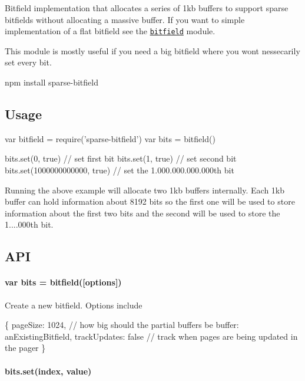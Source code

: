 Bitfield implementation that allocates a series of 1kb buffers to support sparse bitfields without allocating a massive buffer. If you want to simple implementation of a flat bitfield see the \href{https://github.com/fb55/bitfield}{\tt bitfield} module.

This module is mostly useful if you need a big bitfield where you won\textquotesingle{}t nessecarily set every bit.


\begin{DoxyCode}
npm install sparse-bitfield
\end{DoxyCode}


\href{http://travis-ci.org/mafintosh/sparse-bitfield}{\tt }

\subsection*{Usage}


\begin{DoxyCode}
var bitfield = require('sparse-bitfield')
var bits = bitfield()

bits.set(0, true) // set first bit
bits.set(1, true) // set second bit
bits.set(1000000000000, true) // set the 1.000.000.000.000th bit
\end{DoxyCode}


Running the above example will allocate two 1kb buffers internally. Each 1kb buffer can hold information about 8192 bits so the first one will be used to store information about the first two bits and the second will be used to store the 1....\+000th bit.

\subsection*{A\+PI}

\paragraph*{{\ttfamily var bits = bitfield(\mbox{[}options\mbox{]})}}

Create a new bitfield. Options include


\begin{DoxyCode}
\{
  pageSize: 1024, // how big should the partial buffers be
  buffer: anExistingBitfield,
  trackUpdates: false // track when pages are being updated in the pager
\}
\end{DoxyCode}


\paragraph*{{\ttfamily bits.\+set(index, value)}}

